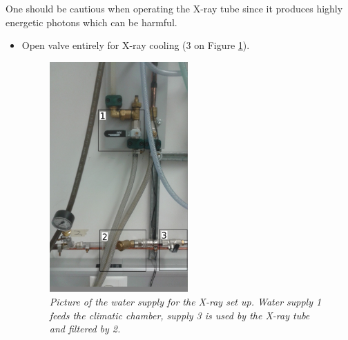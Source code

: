 \documentclass[a4paper,12pt,twoside]{article}
\begin{document}
One should be cautious when operating the X-ray tube since it produces highly energetic photons which can be harmful. 

\begin{itemize}
\item {Open valve entirely for X-ray cooling (3 on Figure \ref{Water}).
\begin{figure} [h!] \centering
\includegraphics[width=0.5\textwidth, angle=0] {./Figures/Water2.jpg}
\caption{\em  \label{Water}
Picture of the water supply for the X-ray set up. Water supply 1 feeds the climatic chamber, supply 3 is used by the X-ray tube and filtered by 2.}
\end{figure}
}


\end{itemize}
\end{document}
